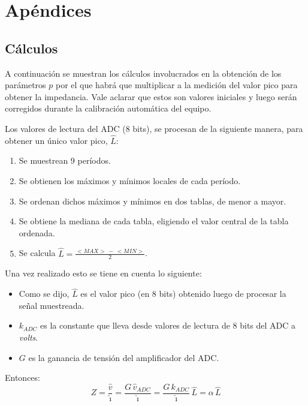 \section{Apéndices}

\subsection{Cálculos}
A continuación se muestran los cálculos involucrados en la obtención de los parámetros $p$ por el que habrá que multiplicar a la medición del valor pico para obtener la impedancia. Vale aclarar que estos son valores iniciales y luego serán corregidos durante la calibración automática del equipo.

Los valores de lectura del ADC (8 bits), se procesan de la siguiente manera, para obtener un único valor pico, $\hat{L}$:
\begin{enumerate}
    \item Se muestrean 9 períodos.
    \item Se obtienen los máximos y mínimos locales de cada período.
    \item Se ordenan dichos máximos y mínimos en dos tablas, de menor a mayor.
    \item Se obtiene la mediana de cada tabla, eligiendo el valor central de la tabla ordenada.
    \item Se calcula $\hat{L} = \frac{<MAX>\,-\,<MIN>}{2}$.
\end{enumerate}

Una vez realizado esto se tiene en cuenta lo siguiente:
\begin{itemize}
    \item Como se dijo, $\hat{L}$ es el valor pico (en 8 bits) obtenido luego de procesar la señal muestreada.
    \item $k_{ADC}$ es la constante que lleva desde valores de lectura de 8 bits del ADC a \emph{volts}.
    \item $G$ es la ganancia de tensión del amplificador del ADC.
\end{itemize}

Entonces:
$$
    Z = \frac{\hat{v}}{\hat{\imath}} = \frac{G\,\hat{v}_{ADC}}{\hat{\imath}} = \frac{G\,k_{ADC}}{\hat{\imath}}\,\hat{L} = \alpha\,\hat{L}
$$


